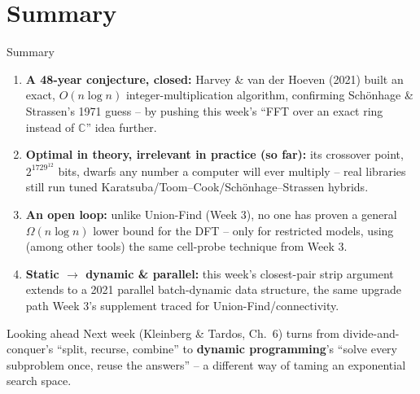 \documentclass[11pt,aspectratio=169]{beamer}
\begin{document}
\section{Summary}

\begin{frame}{Summary}
  \footnotesize
  \begin{enumerate}
    \item \textbf{A 48-year conjecture, closed:} Harvey \& van der Hoeven (2021) built an
    exact, $O(n\log n)$ integer-multiplication algorithm, confirming Schönhage \&
    Strassen's 1971 guess -- by pushing this week's ``FFT over an exact ring instead of
    $\mathbb{C}$'' idea further.
    \item \textbf{Optimal in theory, irrelevant in practice (so far):} its crossover
    point, $2^{1729^{12}}$ bits, dwarfs any number a computer will ever multiply --
    real libraries still run tuned Karatsuba/Toom--Cook/Schönhage--Strassen hybrids.
    \item \textbf{An open loop:} unlike Union-Find (Week 3), no one has proven a general
    $\Omega(n\log n)$ lower bound for the DFT -- only for restricted models, using (among
    other tools) the same cell-probe technique from Week 3.
    \item \textbf{Static $\to$ dynamic \& parallel:} this week's closest-pair strip
    argument extends to a 2021 parallel batch-dynamic data structure, the same upgrade
    path Week 3's supplement traced for Union-Find/connectivity.
  \end{enumerate}
  \begin{alertblock}{Looking ahead}
    Next week (Kleinberg \& Tardos, Ch.~6) turns from divide-and-conquer's ``split,
    recurse, combine'' to \textbf{dynamic programming}'s ``solve every subproblem once,
    reuse the answers'' -- a different way of taming an exponential search space.
  \end{alertblock}
\end{frame}
\end{document}
